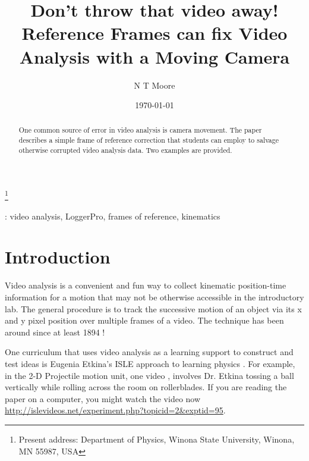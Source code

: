 \documentclass[12pt]{iopart}
\begin{document}
\title[Don't throw that video away! Reference Frames can fix Video Analysis with a Moving Camera]{Don't throw that video away! Reference Frames can fix Video Analysis with a Moving Camera}
\author{N T Moore}
\footnote{Present address:
Department of Physics, Winona State University, Winona, MN 55987, USA}

\date{\today}

\begin{abstract}
One common source of error in video analysis is camera movement.  The paper describes a simple frame of reference correction that students can employ to salvage otherwise corrupted video analysis data.  Two examples are provided. 
\end{abstract}

: video analysis, LoggerPro, frames of reference, kinematics

\submitto{\PED}

\maketitle

\section{Introduction} 
Video analysis is a convenient and fun way to collect kinematic position-time information for a motion that may not be otherwise accessible in the introductory lab.  The general procedure is to track the successive motion of an object via its x and y pixel position over multiple frames of a video.  The technique has been around since at least 1894 \cite{nature_cat}!
  

One curriculum that uses video analysis as a learning support to construct and test ideas is Eugenia Etkina's ISLE approach to learning physics \cite{ISLE_overview}. 
For example, in the 2-D Projectile motion unit, one video \cite{ISLE_ball_video_source}, involves Dr. Etkina tossing a ball vertically while rolling across the room on rollerblades. If you are reading the paper on a computer, you might watch the video now \url{http://islevideos.net/experiment.php?topicid=2&exptid=95}.   
\end{document}
